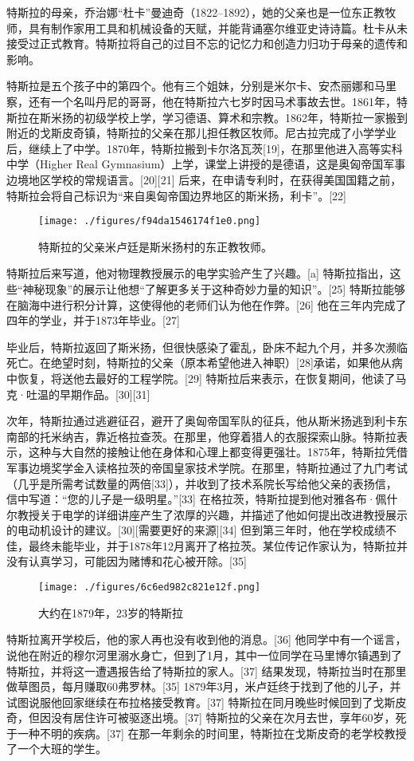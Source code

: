 特斯拉的母亲，乔治娜“杜卡”曼迪奇（1822–1892），她的父亲也是一位东正教牧师，具有制作家用工具和机械设备的天赋，并能背诵塞尔维亚史诗诗篇。杜卡从未接受过正式教育。特斯拉将自己的过目不忘的记忆力和创造力归功于母亲的遗传和影响。

特斯拉是五个孩子中的第四个。他有三个姐妹，分别是米尔卡、安杰丽娜和马里察，还有一个名叫丹尼的哥哥，他在特斯拉六七岁时因马术事故去世。1861年，特斯拉在斯米扬的初级学校上学，学习德语、算术和宗教。1862年，特斯拉一家搬到附近的戈斯皮奇镇，特斯拉的父亲在那儿担任教区牧师。尼古拉完成了小学学业后，继续上了中学。1870年，特斯拉搬到卡尔洛瓦茨[19]，在那里他进入高等实科中学（Higher Real Gymnasium）上学，课堂上讲授的是德语，这是奥匈帝国军事边境地区学校的常规语言。[20][21] 后来，在申请专利时，在获得美国国籍之前，特斯拉会将自己标识为“来自奥匈帝国边界地区的斯米扬，利卡”。[22]
\begin{figure}[ht]
\centering
\texttt{[image: ./figures/f94da1546174f1e0.png]}
\caption{特斯拉的父亲米卢廷是斯米扬村的东正教牧师。} \label{fig_Tesla_3}
\end{figure}
特斯拉后来写道，他对物理教授展示的电学实验产生了兴趣。[a] 特斯拉指出，这些“神秘现象”的展示让他想“了解更多关于这种奇妙力量的知识”。[25] 特斯拉能够在脑海中进行积分计算，这使得他的老师们认为他在作弊。[26] 他在三年内完成了四年的学业，并于1873年毕业。[27]

毕业后，特斯拉返回了斯米扬，但很快感染了霍乱，卧床不起九个月，并多次濒临死亡。在绝望时刻，特斯拉的父亲（原本希望他进入神职）[28]承诺，如果他从病中恢复，将送他去最好的工程学院。[29] 特斯拉后来表示，在恢复期间，他读了马克·吐温的早期作品。[30][31]

次年，特斯拉通过逃避征召，避开了奥匈帝国军队的征兵，他从斯米扬逃到利卡东南部的托米纳吉，靠近格拉查茨。在那里，他穿着猎人的衣服探索山脉。特斯拉表示，这种与大自然的接触让他在身体和心理上都变得更强壮。1875年，特斯拉凭借军事边境奖学金入读格拉茨的帝国皇家技术学院。在那里，特斯拉通过了九门考试（几乎是所需考试数量的两倍[33]），并收到了技术系院长写给他父亲的表扬信，信中写道：“您的儿子是一级明星。”[33] 在格拉茨，特斯拉提到他对雅各布·佩什尔教授关于电学的详细讲座产生了浓厚的兴趣，并描述了他如何提出改进教授展示的电动机设计的建议。[30][需要更好的来源][34] 但到第三年时，他在学校成绩不佳，最终未能毕业，并于1878年12月离开了格拉茨。某位传记作家认为，特斯拉并没有认真学习，可能因为赌博和花心被开除。[35]
\begin{figure}[ht]
\centering
\texttt{[image: ./figures/6c6ed982c821e12f.png]}
\caption{大约在1879年，23岁的特斯拉} \label{fig_Tesla_4}
\end{figure}
特斯拉离开学校后，他的家人再也没有收到他的消息。[36] 他同学中有一个谣言，说他在附近的穆尔河里溺水身亡，但到了1月，其中一位同学在马里博尔镇遇到了特斯拉，并将这一遭遇报告给了特斯拉的家人。[37] 结果发现，特斯拉当时在那里做草图员，每月赚取60弗罗林。[35] 1879年3月，米卢廷终于找到了他的儿子，并试图说服他回家继续在布拉格接受教育。[37] 特斯拉在同月晚些时候回到了戈斯皮奇，但因没有居住许可被驱逐出境。[37] 特斯拉的父亲在次月去世，享年60岁，死于一种不明的疾病。[37] 在那一年剩余的时间里，特斯拉在戈斯皮奇的老学校教授了一个大班的学生。

